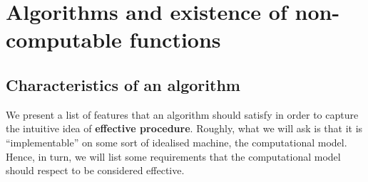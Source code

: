 \chapter{Algorithms and existence of non-computable functions}

\section{Characteristics of an algorithm}
\label{se:alg-char}

We present a list of features that an algorithm should satisfy in
order to capture the intuitive idea of \textbf{effective procedure}. Roughly,
what we will ask is that it is ``implementable'' on some sort of
idealised machine, the computational model. Hence, in turn, we will
list some requirements that the computational model should respect to be
considered effective.

